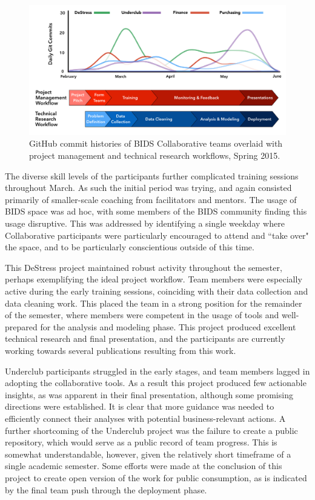 \documentclass[12pt]{article}
\begin{document}
\begin{figure}
\centerline{\includegraphics[scale=0.435]{BIDS_Collaborative_Workflow_NEW.png}}
\caption{GitHub commit histories of BIDS Collaborative teams overlaid with project management and technical research workflows, Spring 2015.}
\label{fig:gitcommits}
\end{figure}

The diverse skill levels of the participants further complicated training sessions throughout March. As such the initial period was trying, and again consisted primarily of smaller-scale coaching from facilitators and mentors. The usage of BIDS space was ad hoc, with some members of the BIDS community finding this usage disruptive. This was addressed by identifying a single weekday where Collaborative participants were particularly encouraged to attend and ``take over" the space, and to be particularly conscientious outside of this time.

This DeStress project maintained robust activity throughout the semester, perhaps exemplifying the ideal project workflow.  Team members were especially active during the early training sessions, coinciding with their data collection and data cleaning work.  This placed the team in a strong position for the remainder of the semester, where members were competent in the usage of tools and well-prepared for the analysis and modeling phase.  This project produced excellent technical research and final presentation, and the participants are currently working towards several publications resulting from this work.

Underclub participants struggled in the early stages, and team members lagged in adopting the collaborative tools.  As a result this project produced few actionable insights, as was apparent in their final presentation, although some promising directions were established. It is clear that more guidance was needed to efficiently connect their analyses with potential business-relevant actions.  A further shortcoming of the Underclub project was the failure to create a public repository, which would serve as a public record of team progress. This is somewhat understandable, however, given the relatively short timeframe of a single academic semester.  Some efforts were made at the conclusion of this project to create open version of the work for public consumption, as is indicated by the final team push through the deployment phase.
\end{document}
